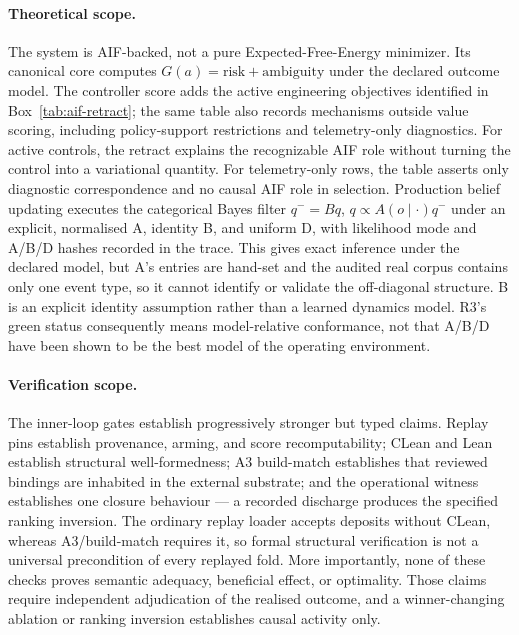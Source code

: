\paragraph{Theoretical scope.} The system is AIF-backed, not a pure Expected-Free-Energy minimizer.  Its canonical core computes $G(a)=\mathrm{risk}+\mathrm{ambiguity}$ under the declared outcome model.  The controller score adds the active engineering objectives identified in Box~\ref{tab:aif-retract}; the same table also records mechanisms outside value scoring, including policy-support restrictions and telemetry-only diagnostics.  For active controls, the retract explains the recognizable AIF role without turning the control into a variational quantity.  For telemetry-only rows, the table asserts only diagnostic correspondence and no causal AIF role in selection.  Production belief updating executes the categorical Bayes filter $q^- = Bq$, $q \propto A(o\mid\cdot)q^-$ under an explicit, normalised A, identity B, and uniform D, with likelihood mode and A/B/D hashes recorded in the trace.  This gives exact inference under the declared model, but A's entries are hand-set and the audited real corpus contains only one event type, so it cannot identify or validate the off-diagonal structure.  B is an explicit identity assumption rather than a learned dynamics model.  R3's green status consequently means model-relative conformance, not that A/B/D have been shown to be the best model of the operating environment.

\paragraph{Verification scope.} The inner-loop gates establish progressively stronger but typed claims. Replay pins establish provenance, arming, and score recomputability; CLean and Lean establish structural well-formedness; A3 build-match establishes that reviewed bindings are inhabited in the external substrate; and the operational witness establishes one closure behaviour --- a recorded discharge produces the specified ranking inversion.  The ordinary replay loader accepts deposits without CLean, whereas A3/build-match requires it, so formal structural verification is not a universal precondition of every replayed fold.  More importantly, none of these checks proves semantic adequacy, beneficial effect, or optimality. Those claims require independent adjudication of the realised outcome, and a winner-changing ablation or ranking inversion establishes causal activity only.

